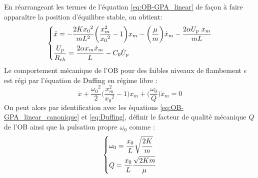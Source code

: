 En réarrangeant les termes de l'équation \ref{eq:OB-GPA_linear} de façon à faire apparaître la position d'équilibre stable, on obtient:
\begin{equation}
\begin{dcases}
\ddot{x} = - \frac{2K{x_0}^2}{mL^2}\biggl(\frac{x_m^2}{{x_0}^2} -1\biggr)x_m
	- \biggl( \frac{\mu}{m} \biggr) \dot{x}_m
	- \frac{2\alpha U_p\ x_m}{mL} \\
\dfrac{U_p}{R_{ch}} = \frac{2\alpha x_m \dot{x}_m}{L} - C_0\dot{U}_p
\end{dcases}
\label{eq:OB-GPA_linear_canonique}
\end{equation}
Le comportement mécanique de l'OB pour des faibles niveaux de flambement $\epsilon$ est régi par l'équation de Duffing en régime libre \cite{Huguet2019} :
\begin{equation}
\ddot{x}  
+ \frac{{\omega_0}^2}{2}\biggl( \frac{x_m^2}{{x_0}^2} - 1 \biggr)x_m
+ \biggl(\frac{\omega_0}{Q}\biggr)\dot{x}_m
= 0
\label{eq:Duffing}
\end{equation}
On peut alors par identification avec les équations \ref{eq:OB-GPA_linear_canonique} et \ref{eq:Duffing}, définir le facteur de qualité mécanique $Q$ de l'OB ainsi que la pulsation propre $\omega_0$ comme :
\begin{equation}
 \begin{dcases}
\omega_0 = \frac{x_0}{L}\sqrt{\frac{2K}{m}} \\
Q = \frac{x_0}{L}\frac{\sqrt{{2Km}}}{\mu}
 \end{dcases}
\label{eq:w0_Q}
\end{equation}
